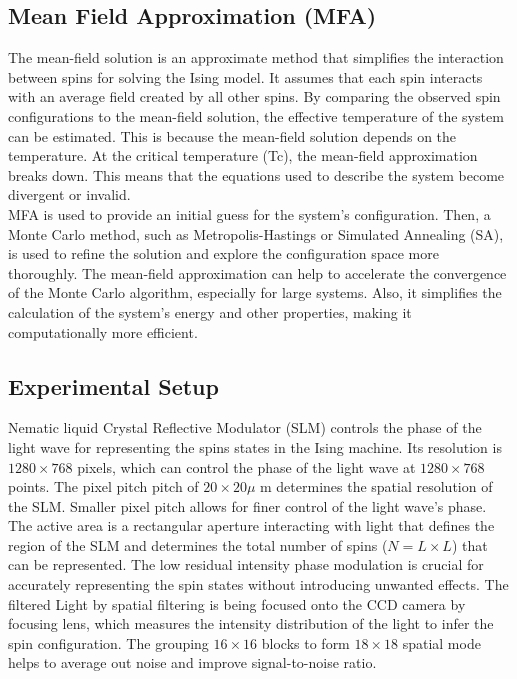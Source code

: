\subsection{Mean Field Approximation (MFA)}
The mean-field solution is an approximate method that simplifies the interaction between spins for solving the Ising model. It assumes that each spin interacts with an average field created by all other spins. By comparing the observed spin configurations to the mean-field solution, the effective temperature of the system can be estimated. This is because the mean-field solution depends on the temperature. At the critical temperature (Tc), the mean-field approximation breaks down. This means that the equations used to describe the system become divergent or invalid.\\

MFA is used to provide an initial guess for the system's configuration. Then, a Monte Carlo method, such as Metropolis-Hastings or Simulated Annealing (SA), is used to refine the solution and explore the configuration space more thoroughly. The mean-field approximation can help to accelerate the convergence of the Monte Carlo algorithm, especially for large systems. Also, it simplifies the calculation of the system's energy and other properties, making it computationally more efficient.\\

\subsection{Experimental Setup}
Nematic liquid Crystal Reflective Modulator (SLM) controls the phase of the light wave for representing the spins states in the Ising machine. Its resolution is $1280 \times 768$ pixels, which can control the phase of the light wave at $1280 \times 768$ points. The pixel pitch pitch of $20 \times 20 \mu$ m determines the spatial resolution of the SLM. Smaller pixel pitch allows for finer control of the light wave's phase. The active area is a rectangular aperture interacting with light that defines the region of the SLM and determines the total number of spins ($N = L \times L$) that can be represented. The low residual intensity phase modulation is crucial for accurately representing the spin states without introducing unwanted effects. The filtered Light by spatial filtering is being focused onto the CCD camera by focusing lens, which measures the intensity distribution of the light to infer the spin configuration. The grouping $16 \times 16$ blocks to form $18 \times 18$ spatial mode helps to average out noise and improve signal-to-noise ratio. 


